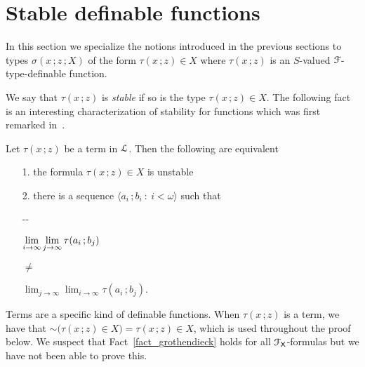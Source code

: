 \section{Stable definable functions}
\def\medrel#1{\parbox{5ex}{\hfil $#1$}}
\def\ceq#1#2#3{\parbox[t]{28ex}{$\displaystyle #1$}\medrel{#2}{$\displaystyle #3$}}

In this section we specialize the notions introduced in the previous sections to types $\sigma(x\,;z\,;X)$ of the form $\tau(x\,;z)\in X$ where $\tau(x\,;z)$ is an $S$-valued ${\EuScript F}$-type-definable function.

We say that $\tau(x\,;z)$ is \emph{stable\/} if so is the type $\tau(x\,;z)\in X$.
The following fact is an interesting characterization of stability for functions which was first remarked in~\cite{B}.

\begin{fact}\label{fact_grothendieck}
  Let $\tau(x\,;z)$ be a term in ${\EuScript L}$.
  Then the following are equivalent
  \begin{itemize}
    \item [1.] the formula $\tau(x\,;z)\in X$ is unstable
    \item [2.] there is a sequence $\langle a_i\,;b_i\ :\ i<\omega\rangle$ such that\smallskip
    
    \noindent\kern-\kern-
    \ceq{\hfill \lim_{i\to\infty}\lim_{j\to\infty}\tau(a_i\,;b_j)}{\neq}{\lim_{j\to\infty}\lim_{i\to\infty}\tau(a_i\,;b_j).}

    



  \end{itemize}
\end{fact}  
  Terms are a specific kind of definable functions.
  When $\tau(x\,;z)$ is a term, we have that ${\sim}\big(\tau(x\,;z)\in X\big)=\tau(x\,;z)\in X$, which is used throughout the proof below.
  We suspect that Fact~\ref{fact_grothendieck} holds for all ${\EuScript F}_{\sf X}$-formulas but we have not been able to prove this.

